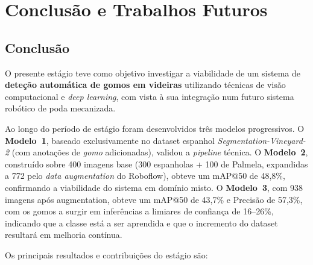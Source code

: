 \chapter{Conclusão e Trabalhos Futuros}
\label{chap:conclusao}

\section{Conclusão}

O presente estágio teve como objetivo investigar a viabilidade de um sistema
de \textbf{deteção automática de gomos em videiras} utilizando técnicas de
visão computacional e \textit{deep learning}, com vista à sua integração num
futuro sistema robótico de poda mecanizada.

Ao longo do período de estágio foram desenvolvidos três modelos
progressivos. O \textbf{Modelo~1}, baseado exclusivamente no dataset espanhol
\textit{Segmentation-Vineyard-2} (com anotações de \textit{gomo} adicionadas),
validou a \textit{pipeline} técnica. O \textbf{Modelo~2}, construído sobre
400 imagens base (300 espanholas + 100 de Palmela, expandidas a 772 pelo
\textit{data augmentation} do Roboflow), obteve um mAP@50 de 48,8\%,
confirmando a viabilidade do sistema em domínio misto. O \textbf{Modelo~3},
com 938 imagens após augmentation, obteve um mAP@50 de 43,7\% e Precisão
de 57,3\%, com os gomos a surgir em inferências a limiares de confiança
de 16--26\%, indicando que a classe está a ser aprendida e que o incremento
do dataset resultará em melhoria contínua.

Os principais resultados e contribuições do estágio são:

